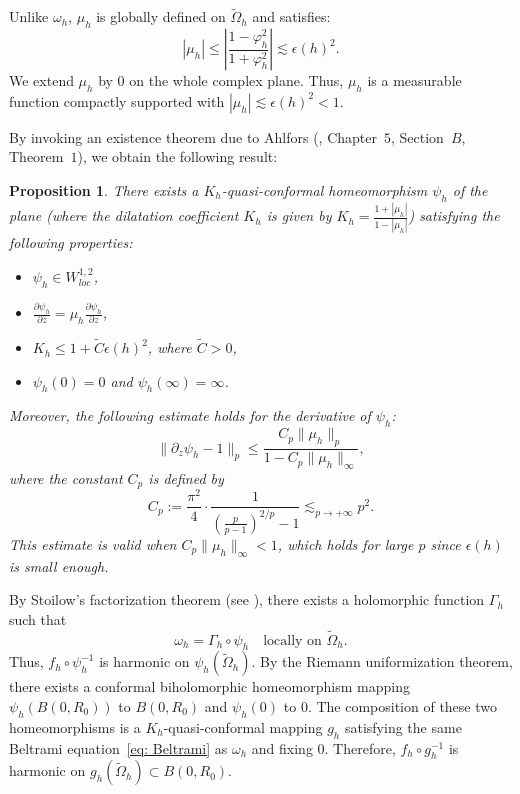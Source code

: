 \documentclass[leqno,11pt,letterpaper, english]{amsart}
\theoremstyle{plain}
\newtheorem{prop}{Proposition}[section]
\theoremstyle{definition}
\numberwithin{equation}{section}
\begin{document}
Unlike $\omega_h$, $\mu_h$ is globally defined on $\tilde{\Omega}_h$ and satisfies:
\begin{equation}
|\mu_h| \leq \left| \frac{1 - \varphi_h^2}{1 + \varphi_h^2} \right| \lesssim \epsilon(h)^2.
\end{equation}
We extend $\mu_h$ by $0$ on the whole complex plane. Thus, $\mu_h$ is a measurable function compactly supported with $|\mu_h| \lesssim \epsilon(h)^2 < 1$. 

By invoking an existence theorem due to Ahlfors (\cite{ahlfors2006lectures}, Chapter~$5$, Section~$B$, Theorem~$1$), we obtain the following result:
\begin{prop}
\label{prop: def_de_psi_h}
There exists a $K_h$-quasi-conformal homeomorphism $\psi_h$ of the plane (where the dilatation coefficient $K_h$ is given by $K_h = \frac{1 + |\mu_h|}{1 - |\mu_h|}$) satisfying the following properties:
\begin{itemize}
    \item $\psi_h \in W_{loc}^{1,2}$,
    \item $\frac{\partial \psi_h}{\partial \bar{z}} = \mu_h \frac{\partial \psi_h}{\partial z}$,
    \item $K_h \leq 1 + \tilde{C} \epsilon(h)^2$, where $\tilde{C} > 0$,
    \item $\psi_h(0) = 0$ and $\psi_h(\infty) = \infty$.
\end{itemize}

Moreover, the following estimate holds for the derivative of $\psi_h$:
\begin{equation}
\|\partial_z \psi_h - 1\|_p \leq \frac{C_p \|\mu_h\|_p}{1 - C_p \|\mu_h\|_\infty},
\end{equation}
where the constant $C_p$ is defined by
\begin{equation}
C_p := \frac{\pi^2}{4} \cdot \frac{1}{\left(\frac{p}{p-1}\right)^{2/p} - 1} \lesssim_{p \to +\infty} p^2.
\end{equation}
This estimate is valid when $C_p \|\mu_h\|_\infty < 1$, which holds for large $p$ since $\epsilon(h)$ is small enough.
\end{prop}

By Stoilow's factorization theorem (see \cite{Astala2008-dh}), there exists a holomorphic function $\Gamma_h$ such that
\begin{equation}
\omega_h = \Gamma_h\circ \psi_h \quad \text{locally on } \tilde{\Omega}_h.
\end{equation}
Thus, $f_h \circ \psi_h^{-1}$ is harmonic on $\psi_h(\tilde{\Omega}_h)$. By the Riemann uniformization theorem, there exists a conformal biholomorphic homeomorphism mapping $\psi_h(B(0, R_0))$ to $B(0, R_0)$ and $\psi_h(0)$ to $0$. The composition of these two homeomorphisms is a $K_h$-quasi-conformal mapping $g_h$ satisfying the same Beltrami equation~\eqref{eq: Beltrami} as $\omega_h$ and fixing $0$. Therefore, $f_h \circ g_h^{-1}$ is harmonic on $g_h(\tilde{\Omega}_h)\subset B(0,R_0)$.
\end{document}
